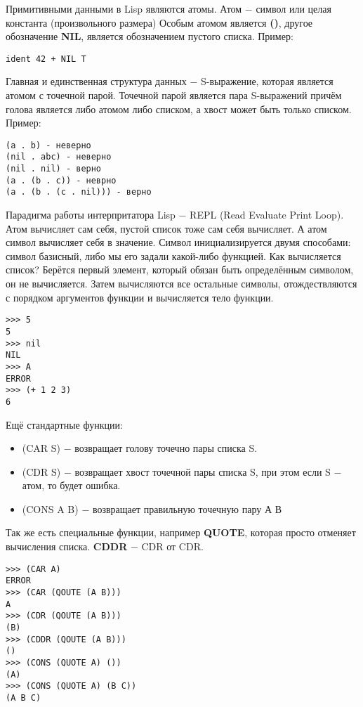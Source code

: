 \documentclass[a4paper, 12pt, titlepage, finall]{extreport}
\begin{document}
            Примитивными данными в Lisp являются атомы.
            Атом $-$ символ или целая константа (произвольного размера)
            Особым атомом является \textbf{()}, другое обозначение \textbf{NIL}, является обозначением пустого списка.
            Пример:
\begin{lstlisting}
ident 42 + NIL T
\end{lstlisting}
            Главная и единственная структура данных $-$ S-выражение, которая является атомом с точечной парой.
            Точечной парой является пара S-выражений причём голова является либо атомом либо списком, а хвост может быть только списком.
            Пример: 
\begin{lstlisting}            
(a . b) - неверно
(nil . abc) - неверно
(nil . nil) - верно
(a . (b . c)) - неврно
(a . (b . (c . nil))) - верно
\end{lstlisting}
            Парадигма работы интерпритатора Lisp $-$ REPL (Read Evaluate Print Loop).
            Атом вычисляет сам себя, пустой список тоже сам себя вычисляет. А атом символ вычисляет себя в значение.
            Символ инициализируется двумя способами: символ базисный, либо мы его задали какой-либо функцией.
            Как вычисляется список? Берётся первый элемент, который обязан быть определённым символом, он не вычисляется.
            Затем вычисляются все остальные символы, отождествляются с порядком аргументов функции и вычисляется тело функции.
\begin{lstlisting}
>>> 5
5
>>> nil
NIL
>>> A
ERROR
>>> (+ 1 2 3)
6
\end{lstlisting}
            Ещё стандартные функции:
            \begin{itemize}
                \item (CAR S) $-$ возвращает голову точечно пары списка S.
                \item (CDR S) $-$ возвращает хвост точечной пары списка S, при этом если S $-$ атом, то будет ошибка.
                \item (CONS A B) $-$ возвращает правильную точечную пару А В
            \end{itemize}
            Так же есть специальные функции, например \textbf{QUOTE}, которая просто отменяет вычисления списка.
            \textbf{CDDR} $-$ CDR от CDR.
\begin{lstlisting}
>>> (CAR A)
ERROR
>>> (CAR (QOUTE (A B)))
A
>>> (CDR (QOUTE (A B)))
(B)
>>> (CDDR (QOUTE (A B)))
()
>>> (CONS (QUOTE A) ())
(A)
>>> (CONS (QUOTE A) (B C))
(A B C)
\end{lstlisting}
\end{document}
